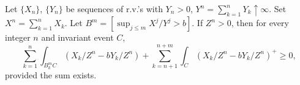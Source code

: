 Let $\{X_n\}$, $\{Y_n\}$ be sequences of r.v.'s with $Y_n>0$, $Y^n=\sum_{k=1}^n Y_k\uparrow\infty$. Set $X^n=\sum_{k=1}^n X_k$. Let $B^m=[\sup_{j\leq m} X^j/Y^j>b]$. If $Z^n>0$, then for every integer $n$ and invariant event $C$,
$$\sum_{k=1}^{n}\int_{B_k^m C}(X_k/Z^n-bY_k/Z^n)+\sum_{k=n+1}^{n+m}\int_C(X_k/Z^n-bY_k/Z^n)^+\geq 0,$$
provided the sum exists.
